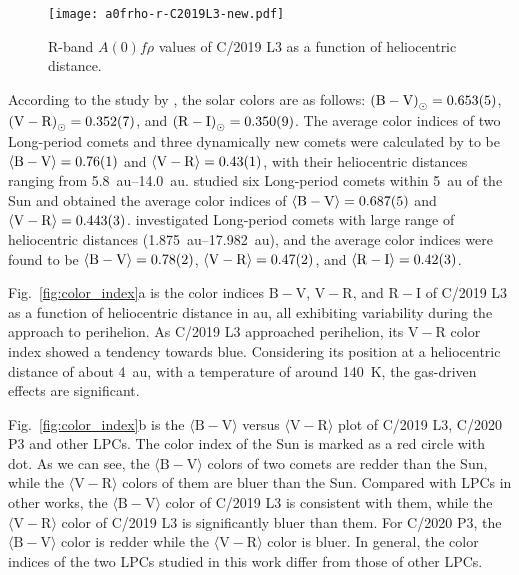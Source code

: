 \begin{figure}
    \centering
    \texttt{[image: a0frho-r-C2019L3-new.pdf]}
    \caption{R-band $A(0)f\rho$ values of C/2019 L3 as a function of heliocentric distance. }\label{fig:a0frho-c2019}
\end{figure}

According to the study by \cite{ramirez_ubvric_2012}, the solar colors are as follows: 
${(\mathrm{B} - \mathrm{V})}_{\odot} = \num{0.653 +- 0.005}$, 
${(\mathrm{V} - \mathrm{R})}_{\odot} = \num{0.352 +- 0.007}$, and 
${(\mathrm{R} - \mathrm{I})}_{\odot} = \num{0.350 +- 0.009}$. 
The average color indices of two Long-period comets and three dynamically new comets were calculated by \cite{meech_activity_2009} to be 
$\langle \mathrm{B} - \mathrm{V} \rangle = \num{0.76 +- 0.01}$ and 
$\langle \mathrm{V} - \mathrm{R} \rangle = \num{0.43 +- 0.01}$, 
with their heliocentric distances ranging from \SIrange{5.8}{14.0}{\astronomicalunit}. 
\cite{solontoi_ensemble_2012} studied six Long-period comets within \SI{5}{\astronomicalunit} of the Sun and obtained the average color indices of 
$\langle \mathrm{B} - \mathrm{V} \rangle = \num{0.687 +- 0.005}$ and 
$\langle \mathrm{V} - \mathrm{R} \rangle = \num{0.443 +- 0.003}$. 
\cite{jewittCOLORSYSTEMATICSCOMETS2015} investigated Long-period comets with large range of heliocentric distances (\SIrange{1.875}{17.982}{\astronomicalunit}), and the average color indices were found to be 
$\langle \mathrm{B} - \mathrm{V} \rangle = \num{0.78 +- 0.02}$, 
$\langle \mathrm{V} - \mathrm{R} \rangle = \num{0.47 +- 0.02}$, and 
$\langle \mathrm{R} - \mathrm{I} \rangle = \num{0.42 +- 0.03}$. 

Fig.~\ref{fig:color_index}a is the color indices $\mathrm{B}-\mathrm{V}$, $\mathrm{V}-\mathrm{R}$, and $\mathrm{R}-\mathrm{I}$ of C/2019 L3 as a function of heliocentric distance in \si{\astronomicalunit}, all exhibiting variability during the approach to perihelion. 
As C/2019 L3 approached perihelion, its $\mathrm{V}-\mathrm{R}$ color index showed a tendency towards blue. 
Considering its position at a heliocentric distance of about {\SI{4}{\astronomicalunit}}, with a temperature of around {\SI{140}{\K}}, the gas-driven effects are significant. 

Fig.~\ref{fig:color_index}b is the $\langle \mathrm{B}-\mathrm{V} \rangle$ versus $\langle \mathrm{V}-\mathrm{R} \rangle$ plot of C/2019 L3, C/2020 P3 and other LPCs. 
The color index of the Sun \citep{ramirez_ubvric_2012} is marked as a red circle with dot. 
As we can see, the $\langle \mathrm{B} - \mathrm{V} \rangle$ colors of two comets are redder than the Sun, while the $\langle \mathrm{V} - \mathrm{R} \rangle$ colors of them are bluer than the Sun. 
Compared with LPCs in other works, the $\langle \mathrm{B} - \mathrm{V} \rangle$ color of C/2019 L3 is consistent with them, while the $\langle \mathrm{V} - \mathrm{R} \rangle$ color of C/2019 L3 is significantly bluer than them. For C/2020 P3, the $\langle \mathrm{B} - \mathrm{V} \rangle$ color is redder while the $\langle \mathrm{V} - \mathrm{R} \rangle$ color is bluer. 
In general, the color indices of the two LPCs studied in this work differ from those of other LPCs. 


